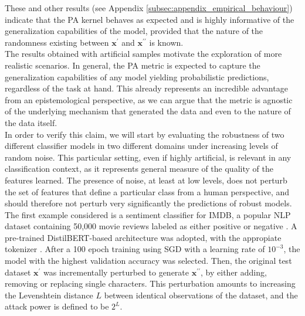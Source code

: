 These and other results (see Appendix \ref{subsec:appendix_empirical_behaviour}) indicate
that the PA kernel behaves as expected and is highly informative of the generalization
capabilities of the model, provided that the nature of the randomness existing
between $\bm{x}^\prime$ and $\bm{x}^{\prime \prime}$ is known. \\

The results obtained with artificial samples motivate the exploration of more realistic
scenarios. In general, the PA metric is expected to capture the generalization capabilities
of any model yielding probabilistic predictions, regardless of the task at hand. This
already represents an incredible advantage from an epistemological perspective, as we
can argue that the metric is agnostic of the underlying mechanism that generated the data
and even to the nature of the data itself. \\

In order to verify this claim, we will start by evaluating the robustness of two
different classifier models in two different domains under increasing levels of 
random noise. This particular setting, even if highly artificial, is 
relevant in any classification context, as it represents general measure of the 
quality of the features learned. The presence of noise, at least 
at low levels, does not perturb the set of features that define a particular class from
a human perspective, and should therefore not perturb very significantly the
predictions of robust models. \\

The first example considered is a sentiment classifier for IMDB,
a popular NLP dataset containing 50,000 movie reviews labeled 
as either positive or negative
\cite{maas2011learning}. 
A pre-trained DistilBERT-based architecture 
was adopted, with the appropiate tokenizer
\cite{sanh2019distilbert}. 
After a 100 epoch training using SGD with a learning rate of $10^{-3}$, the model with the highest validation
accuracy was selected. Then, the original test dataset $\bm{x}^\prime$
was incrementally perturbed 
to generate $\bm{x}^{\prime \prime}$, by either adding, removing or replacing 
single characters. This perturbation amounts to increasing the Levenshtein
distance $L$ between identical observations of the dataset, and the attack power
is defined to be $2^{L}$.

